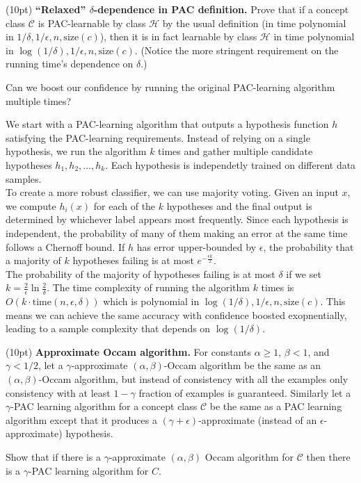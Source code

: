 \documentclass[11pt]{article}
\newcommand*{\C}{{\mathcal C}}
\newcommand*{\Hp}{{\mathcal H}}
\DeclareMathOperator{\1}{\mathbbm{1}}
\begin{document}
\begin{problem} (10pt) \textbf{``Relaxed'' $\delta$-dependence in PAC definition.}
Prove that if a concept class $\C$ is PAC-learnable by class $\Hp$ by the usual definition (in time polynomial in $1/\delta, 1/\epsilon, n, \text{size}(c)$), then it is in fact learnable by class $\Hp$ in time polynomial in $\log(1/\delta), 1/\epsilon, n, \text{size}(c)$. (Notice the more stringent requirement on the
running time's dependence on $\delta$.)
\end{problem}
\begin{hint}
	Can we boost our confidence by running the original PAC-learning algorithm multiple times?
\end{hint}
We start with a PAC-learning algorithm that outputs a hypothesis function $h$ satisfying the PAC-learning requirements. Instead of relying on a single hypothesis, we run the algorithm $k$ times and gather multiple candidate hypotheses $h_1, h_2, \ldots, h_k$. Each hypothesis is independetly trained on different data samples. \\
To create a more robust classifier, we can use majority voting. Given an input $x$, we compute $h_i(x)$ for each of the $k$ hypotheses and the final output is determined by whichever label appears most frequently. Since each hypothesis is independent, the probability of many of them making an error at the same time follows a Chernoff bound. If $h$ has error upper-bounded by $\epsilon$, the probability that a majority of $k$ hypotheses failing is at most $e^{-\frac{\epsilon k}{2}}$. \\
The probability of the majority of hypotheses failing is at most $\delta$ if we set $k = \frac{2}{\epsilon}\ln \frac{2}{\delta}$. The time complexity of running the algorithm $k$ times is $O(k \cdot \text{time}(n, \epsilon, \delta))$ which is polynomial in $\log(1/\delta), 1/\epsilon, n, \text{size}(c)$. This means we can achieve the same accuracy with confidence boosted exopnentially, leading to a sample complexity that depends on $\log(1/\delta)$.


\begin{problem} (10pt) \textbf{Approximate Occam algorithm.}
For constants $\alpha \geq 1$, $\beta <1$, and $\gamma
<1/2$, let a $\gamma$-approximate $(\alpha,\beta)$-Occam algorithm be the same
as an $(\alpha,\beta)$-Occam algorithm, but instead of consistency with all the
examples only consistency with at least $1-\gamma$ fraction of examples is
guaranteed. Similarly let a $\gamma$-PAC learning algorithm for a concept class
$\C$ be the same as a PAC learning algorithm except that it produces a
$(\gamma+\epsilon)$-approximate (instead of an $\epsilon$-approximate)
hypothesis.

Show that if there is a $\gamma$-approximate $(\alpha,\beta)$ Occam
algorithm for $\C$ then there is a $\gamma$-PAC learning algorithm for $C$.
\end{problem}
\end{document}
